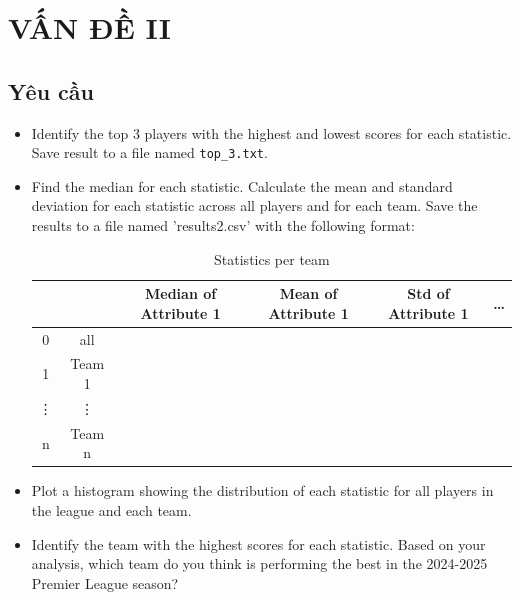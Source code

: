 \documentclass[12pt]{report}
\begin{document}
\chapter{VẤN ĐỀ II}
{
\section{Yêu cầu}
\begin{itemize}
	\item Identify the top 3 players with the highest and lowest scores for each statistic. Save result to a file named \texttt{top\_3.txt}.
	\item Find the median for each statistic. Calculate the mean and standard deviation for each statistic across all players and for each team. Save the results to a file named 'results2.csv' with the following format:
	\begin{table}[h]
		\centering
		\begin{tabular}{|c|c|c|c|c|c|}
		\hline
		 &  & Median of Attribute 1 & Mean of Attribute 1 & Std of Attribute 1 & \ldots \\ \hline
		0 & all &  &  &  &  \\ \hline
		1 & Team 1 &  &  &  &  \\ \hline
		\vdots & \vdots &  &  &  &  \\ \hline
		n & Team n &  &  &  &  \\ \hline
		\end{tabular}
		\caption{Statistics per team}
	\end{table}
	\item Plot a histogram showing the distribution of each statistic for all players in the league and each team.
	\item Identify the team with the highest scores for each statistic. Based on your analysis, which team do you think is performing the best in the 2024-2025 Premier League season?
\end{itemize}
}
\end{document}
